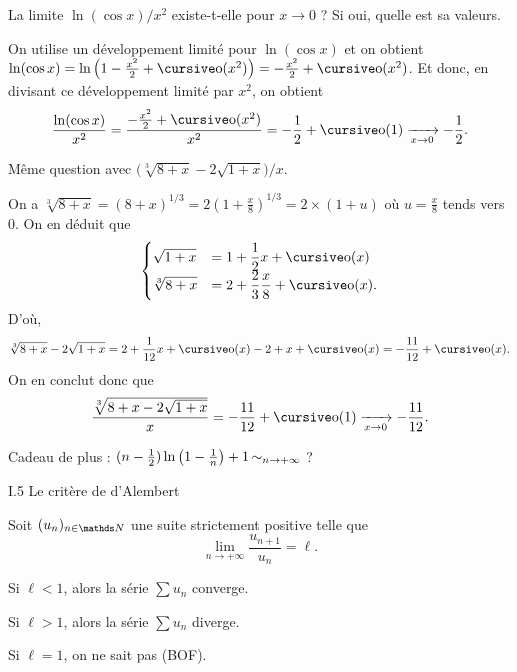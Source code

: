 \centerline{La limite $\ln(\cos x) / x^2$\/ existe-t-elle pour $x \to 0$\/ ? Si oui, quelle est sa valeurs.}

On utilise un développement limité pour $\ln(\cos x)$\/ et on obtient $\ln(\cos x) = \ln\left( 1 - \frac{x^2}{2} + \po(x^2) \right) = -\frac{x^2}{2} + \po(x^2)$. Et donc, en divisant ce développement limité par $x^2$, on obtient \[
	\frac{\ln(\cos x)}{x^2} = \frac{-\frac{x^2}{2} + \po(x^2)}{x^2} = -\frac{1}{2} + \po(1) \tendsto{x \to 0} -\frac{1}{2}
.\]

\centerline{Même question avec $\big(\sqrt[3]{8+x} - 2\sqrt{1+x}\big) / x$.}

\bigskip

On a $\sqrt[3]{8+x} = (8+x)^{1 / 3} = 2 \left( 1 + \frac{x}{8} \right)^{1 / 3} = 2\times (1 + u)$\/ où $u = \frac{x}{8}$\/ tends vers $0$.
On en déduit que \[
	\begin{cases}
		\ds\sqrt{1+x} &=\ds 1 + \frac{1}{2}x + \po(x)\\
		\ds\sqrt[3]{8 + x} &=\ds 2 + \frac{2}{3} \frac{x}{8} + \po(x).
	\end{cases}
\] 
D'où, \[
	\sqrt[3]{8 + x}  - 2\sqrt{1+x} = 2 + \frac{1}{12} x + \po(x) - 2 + x + \po(x) = - \frac{11}{12} + \po(x)
.\]
On en conclut donc que \[
	\frac{\sqrt[3]{8+ x - 2\sqrt{1+x}}}{x} = -\frac{11}{12} + \po(1) \tendsto{x \to 0} -\frac{11}{12}
.\]

\bigskip

Cadeau de plus : $(n - \frac{1}{2}) \ln\left( 1 - \frac{1}{n} \right) + 1 \operatorname*{\sim}_{n\to +\infty}$\/ ?

\bigskip

\bigskip

\begin{center}
	\large\sc I.5 \quad Le critère de d'Alembert
\end{center}

\bigskip

\begin{thm}
	Soit $(u_n)_{n\in\N}$\/ une suite strictement positive telle que \[
		\lim_{n\to +\infty} \frac{u_{n+1}}{u_n} = \ell
	.\]

	\begin{enumerate}
		\item Si $\ell < 1$, alors la série $\sum u_n$\/ converge.
		\item Si $\ell > 1$, alors la série $\sum u_n$\/ diverge.
		{\color{gray}\item Si $\ell = 1$, on ne sait pas (BOF).}
	\end{enumerate}
\end{thm}

